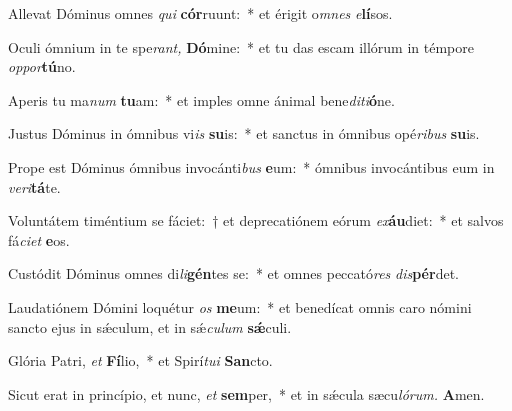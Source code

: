 \item Allevat Dóminus omnes \textit{qui} \textbf{cór}ruunt:~* et érigit o\textit{mnes} \textit{e}\textbf{lí}sos.
\item Oculi ó\-mnium in te spe\textit{rant,} \textbf{Dó}mine:~* et tu das escam illórum in témpore \textit{oppor}\textbf{tú}no.
\item Aperis tu ma\textit{num} \textbf{tu}am:~* et imples omne ánimal bene\textit{diti}\textbf{ó}ne.
\item Justus Dóminus in ómnibus vi\textit{is} \textbf{su}is:~* et san\-ctus in ó\-mnibus opé\textit{ribus} \textbf{su}is.
\item Prope est Dóminus ómnibus invocánti\textit{bus} \textbf{e}um:~* ó\-mnibus invocántibus eum in \textit{veri}\textbf{tá}te.
\item Voluntátem timéntium se fáciet:~† et deprecatiónem eórum \textit{ex}\textbf{áu}diet:~* et salvos fá\textit{ciet} \textbf{e}os.
\item Custódit Dóminus omnes di\textit{li}\textbf{gén}tes se:~* et o\-mnes peccató\textit{res} \textit{dis}\textbf{pér}det.
\item Laudatiónem Dómini loquétur \textit{os} \textbf{me}um:~* et benedícat o\-mnis caro nómini sancto ejus in sǽculum, et in sǽ\hspace*{0.02em}\textit{cu}\textit{lum} \textbf{sǽ}culi.
\item Glória Patri, \textit{et} \textbf{Fí}lio,~* et Spirí\tinyhspace\textit{tui} \textbf{San}cto.
\item Sicut erat in princípio, et nunc, \textit{et} \textbf{sem}per,~* et in sǽcula sæcu\tinyhspace\textit{lórum.} \textbf{A}men.